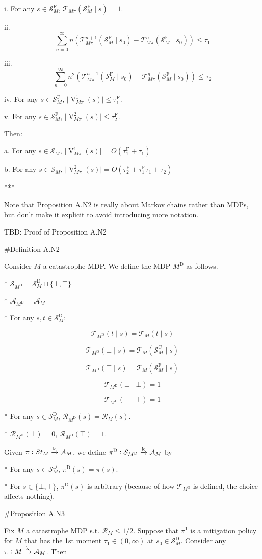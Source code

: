 \documentclass[a4paper]{article}
\newcommand{\AP}[1]{\left(#1\right)}
\newcommand{\Abs}[1]{\lvert #1 \rvert}
\newcommand{\M}{\xrightarrow{\textnormal{k}}}
\newcommand{\A}{\mathcal{A}}
\newcommand{\St}{\mathcal{S}}
\newcommand{\T}{\mathcal{T}}
\newcommand{\R}{\mathcal{R}}
\newcommand{\SF}{\St^{\text{F}}}
\newcommand{\SD}{\St^{\text{D}}}
\newcommand{\SC}{\St^{\text{C}}}
\newcommand{\MD}{M^{\text{D}}}
\newcommand{\TF}{\tau^{\text{F}}}
\newcommand{\PD}{\pi^{\text{D}}}
\newcommand{\V}{\operatorname{V}}
\begin{document}
i. For any $s \in \SF_M$, $\T_{M\pi}\AP{\SF_M \mid s}=1$.

ii. $$\sum_{n=0}^\infty n \AP{\T_{M\pi}^{n+1}\AP{\SF_M \mid s_0}-\T_{M\pi}^{n}\AP{\SF_M \mid s_0}} \leq \tau_1$$

iii. $$\sum_{n=0}^\infty n^2 \AP{\T_{M\pi}^{n+1}\AP{\SF_M \mid s_0}-\T_{M\pi}^{n}\AP{\SF_M \mid s_0}} \leq \tau_2$$

iv. For any $s \in \SF_M$, $\Abs{\V^1_{M\pi}(s)} \leq \TF_1$.

v. For any $s \in \SF_M$, $\Abs{\V^2_{M\pi}(s)} \leq \TF_2$. 

Then:

a. For any $s \in \St_M$, $\Abs{\V^1_{M\pi}(s)} = O\AP{\TF_1 + \tau_1}$

b. For any $s \in \St_M$, $\Abs{\V^2_{M\pi}(s)} = O\AP{\TF_2 + \TF_1 \tau_1 + \tau_2}$

***

Note that Proposition A.N2 is really about Markov chains rather than MDPs, but don't make it explicit to avoid introducing more notation.

TBD: Proof of Proposition A.N2

\#Definition A.N2

Consider $M$ a catastrophe MDP. We define the MDP $\MD$ as follows.

* $\St_{\MD} = \SD_M \sqcup \{\bot,\top\}$

* $\A_{\MD} = \A_M$

* For any $s,t \in \SD_M$: 

$$\T_{\MD}(t \mid s) = \T_M(t \mid s)$$

$$\T_{\MD}(\bot \mid s) = \T_M(\SC_M \mid s)$$

$$\T_{\MD}(\top \mid s) = \T_M(\SF_M \mid s)$$

$$\T_{\MD}(\bot \mid \bot) = 1$$

$$\T_{\MD}(\top \mid \top) = 1$$

* For any $s \in \SD_M$, $\R_{\MD}(s) = \R_M(s)$.

* $\R_{\MD}(\bot) = 0$, $\R_{\MD}(\top) = 1$.

Given $\pi: St_M \M \A_M$, we define $\PD: \St_{\MD} \M \A_M$ by

* For any $s \in \SD_M$, $\PD(s) = \pi(s)$.

* For $s \in \{\bot,\top\}$, $\PD(s)$ is arbitrary (because of how $\T_{\MD}$ is defined, the choice affects nothing).

\#Proposition A.N3

Fix $M$ a catastrophe MDP s.t. $\R_M \leq 1/2$. Suppose that $\pi^1$ is a mitigation policy for $M$ that has the 1st moment $\tau_{1}\in(0,\infty)$ at $s_0 \in \SD_M$. Consider any $\pi: M \M \A_M$. Then
\end{document}
